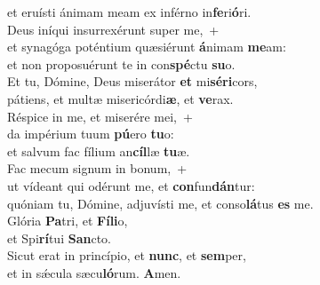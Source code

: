 \evenverse et eruísti ánimam meam ex inférno in\textbf{fe}ri\textbf{ó}ri.\\
\oddverse Deus iníqui insurrexérunt super me,~+\\
\oddverse  et synagóga poténtium quæsiérunt \textbf{á}nimam \textbf{me}am:~\*\\
\oddverse et non proposuérunt te in con\textbf{spé}ctu \textbf{su}o.\\
\evenverse Et tu, Dómine, Deus miserátor \textbf{et} mi\textbf{sé}\textbf{ri}cors,~\*\\
\evenverse pátiens, et multæ misericórdi\textbf{æ}, et \textbf{ve}rax.\\
\oddverse Réspice in me, et miserére mei,~+\\
\oddverse  da impérium tuum \textbf{pú}ero \textbf{tu}o:~\*\\
\oddverse et salvum fac fílium an\textbf{cíl}læ \textbf{tu}æ.\\
\evenverse Fac mecum signum in bonum,~+\\
\evenverse  ut vídeant qui odérunt me, et \textbf{con}fun\textbf{dán}tur:~\*\\
\evenverse quóniam tu, Dómine, adjuvísti me, et conso\textbf{lá}tus \textbf{es} me.\\
\oddverse Glória \textbf{Pa}tri, et \textbf{Fí}\textbf{li}o,~\*\\
\oddverse et Spi\textbf{rí}tui \textbf{San}cto.\\
\evenverse Sicut erat in princípio, et \textbf{nunc}, et \textbf{sem}per,~\*\\
\evenverse et in sǽcula sæcu\textbf{ló}rum. \textbf{A}men.\\
